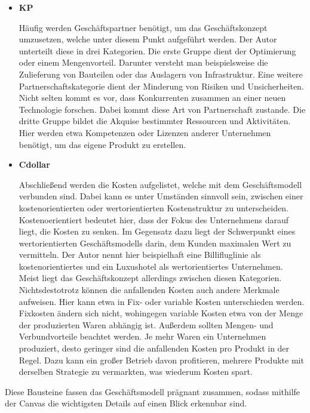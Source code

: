 \begin{itemize}
	\item \textbf{\ac{KP}}
	
	Häufig werden Geschäftspartner benötigt, um das Geschäftskonzept umzusetzen, welche unter diesem Punkt aufgeführt werden. Der Autor unterteilt diese in drei Kategorien. Die erste Gruppe dient der Optimierung oder einem Mengenvorteil. Darunter versteht man beispielsweise die Zulieferung von Bauteilen oder das Auslagern von Infrastruktur. Eine weitere Partnerschaftskategorie dient der Minderung von Risiken und Unsicherheiten. Nicht selten kommt es vor, dass Konkurrenten zusammen an einer neuen Technologie forschen. Dabei kommt diese Art von Partnerschaft zustande. Die dritte Gruppe bildet die Akquise bestimmter Ressourcen und Aktivitäten. Hier werden etwa Kompetenzen oder Lizenzen anderer Unternehmen benötigt, um das eigene Produkt zu erstellen.
	
	\item \textbf{\ac{Cdollar}}
	
	Abschließend werden die Kosten aufgelistet, welche mit dem Geschäftsmodell verbunden sind. Dabei kann es unter Umständen sinnvoll sein, zwischen einer kostenorientierten oder wertorientierten Kostenstruktur zu unterscheiden. Kostenoerientiert bedeutet hier, dass der Fokus des Unternehmens darauf liegt, die Kosten zu senken. Im Gegensatz dazu liegt der Schwerpunkt eines wertorientierten Geschäftsmodells darin, dem Kunden maximalen Wert zu vermitteln. Der Autor nennt hier beispielhaft eine Billifluglinie als kostenorientiertes und ein Luxushotel als wertorientiertes Unternehmen. Meist liegt das Geschäftskonzept allerdings zwischen diesen Kategorien. Nichtsdestotrotz können die anfallenden Kosten auch andere Merkmale aufweisen. Hier kann etwa in Fix- oder variable Kosten unterschieden werden. Fixkosten ändern sich nicht, wohingegen variable Kosten etwa von der Menge der produzierten Waren abhängig ist. Außerdem sollten Mengen- und Verbundvorteile beachtet werden. Je mehr Waren ein Unternehmen produziert, desto geringer sind die anfallenden Kosten pro Produkt in der Regel. Dazu kann ein großer Betrieb davon profitieren, mehrere Produkte mit derselben Strategie zu vermarkten, was wiederum Kosten spart.
	
\end{itemize}

Diese Bausteine fassen das Geschäftsmodell prägnant zusammen, sodass mithilfe der Canvas die wichtigsten Details auf einen Blick erkennbar sind.
\cite{BusinessModelGeneration}